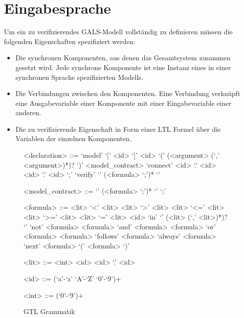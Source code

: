 \section{Eingabesprache}
Um ein zu verifizierendes GALS-Modell vollständig zu definieren müssen die folgenden Eigenschaften spezifiziert werden:
\begin{itemize}
\item Die synchronen Komponenten, aus denen das Gesamtsystem zusammen gesetzt wird.
  Jede synchrone Komponente ist eine Instanz eines in einer synchronen Sprache spezifizierten Modells.
\item Die Verbindungen zwischen den Komponenten.
  Eine Verbindung verknüpft eine Ausgabevariable einer Komponente mit einer Eingabevariable einer anderen.
\item Die zu verifizierende Eigenschaft in Form einer LTL Formel über die Variablen der einzelnen Komponenten.
\end{itemize}

\begin{figure}
  \begin{grammar}
    <declaration> ::= `model' `[' <id> `]' <id> `(' (<argument> (`,' <argument>)*)? `)' <model_contract>
    \alt `connect' <id> `.' <id> <id> `.' <id> `;'
    \alt `verify' `{' (<formula> `;')* `}'
    
    <model_contract> ::= `{' (<formula> `;')* `}'
    \alt `;'
    
    <formula> ::= <lit> `<' <lit>
    \alt <lit> `>' <lit>
    \alt <lit> `<=' <lit>
    \alt <lit> `>=' <lit>
    \alt <lit> `=' <lit>
    \alt <id> `in' `{' (<lit> (`,' <lit>)*)? `}'
    \alt `not' <formula>
    \alt <formula> `and' <formula>
    \alt <formula> `or' <formula>
    \alt <formula> `follows' <formula>
    \alt `always' <formula>
    \alt `next' <formula>
    \alt `(' <formula> `)'
    
    <lit> ::= <int>
    \alt <id>
    \alt <id> `.' <id>
    
    <id> ::= (`a'-`z' `A'-`Z' `0'-`9')+
    
    <int> ::= (`0'-`9')+
  \end{grammar}
  \caption{GTL Grammatik}
\end{figure}



